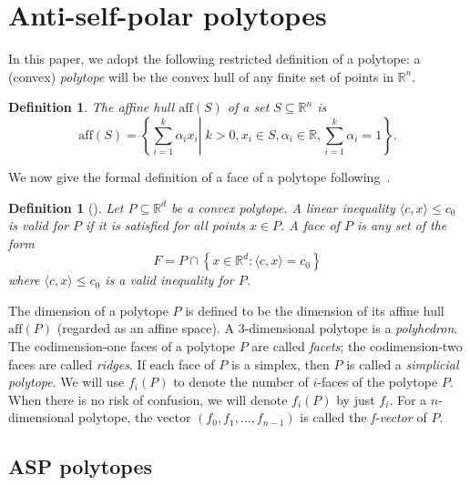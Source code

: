 \documentclass[12pt]{amsart}
\theoremstyle{plain}
\newtheorem{definition}[theorem]{Definition}
\newcommand{\R}{\mathbb{R}}
\numberwithin{equation}{section}
\begin{document}
\section{Anti-self-polar polytopes}




In this paper, we adopt the following restricted definition of a
polytope: a (convex) \emph{polytope} will be the convex hull of any
finite set of points in $\R^n$.




\begin{definition}
The \emph{affine hull} $\mathrm{aff}(S)$ of a set $S\subseteq\R^n$ is
\[
\mathrm{aff}(S)=\left\{\sum_{i=1}^{k} \alpha_{i} x_{i} \left| \; k>0,
x_{i} \in S, \alpha_{i} \in \mathbb{R}, \sum_{i=1}^{k}
\alpha_{i}=1\right.\right\}.
\]
\end{definition}

We now give the formal definition of a face of a polytope following~\cite{ziegler2012lectures}.



\begin{definition}[{\cite[Definition~2.1]{ziegler2012lectures}}]
Let $P \subseteq \mathbb{R}^{d}$ be a convex polytope. A linear inequality $\langle{c}, {x}\rangle \leq c_{0}$ is valid for $P$ if it is satisfied for all points ${x} \in P$. A \emph{face} of $P$ is any set of the form
$$
F=P \cap\left\{{x} \in \mathbb{R}^{d}: \langle{c}, {x}\rangle=c_{0}\right\}
$$
where $\langle{c}, {x}\rangle \leq c_{0}$ is a valid inequality for $P$.
\end{definition}

The dimension of a polytope $P$ is defined to be the dimension of its
affine hull $\mathrm{aff}(P)$ (regarded as an affine space).  A
$3$-dimensional polytope is a \emph{polyhedron}.  The codimension-one
faces of a polytope $P$ are called \emph{facets}; the codimension-two
faces are called \emph{ridges}.  If each face of $P$ is a simplex,
then $P$ is called a \emph{simplicial polytope}.  We will use $f_i(P)$
to denote the number of $i$-faces of the polytope $P$.
When there is no risk of confusion, we will denote
  $f_i(P)$ by just $f_i$.  For a $n$-dimensional polytope, the vector
$(f_0, f_1, \dots, f_{n-1})$ is called the \emph{f-vector} of $P$.




\subsection{ASP polytopes}
\end{document}
